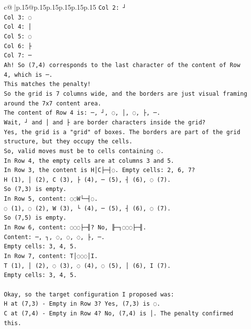 \documentclass{article}
\begin{document}
{\begin{supertabular}{c@{$\;$}|p{.15\linewidth}@{}p{.15\linewidth}p{.15\linewidth}p{.15\linewidth}p{.15\linewidth}p{.15\linewidth}}
{{{\texttt{Col 2: ┘} \\
\texttt{Col 3: ◌} \\
\texttt{Col 4: │} \\
\texttt{Col 5: ◌} \\
\texttt{Col 6: ├} \\
\texttt{Col 7: ─} \\
\texttt{Ah! So (7,4) corresponds to the last character of the content of Row 4, which is ─.} \\
\texttt{This matches the penalty!} \\
\texttt{So the grid is 7 columns wide, and the borders are just visual framing around the 7x7 content area.} \\
\texttt{The content of Row 4 is: ─, ┘, ◌, │, ◌, ├, ─.} \\
\texttt{Wait, ┘ and │ and ├ are border characters inside the grid?} \\
\texttt{Yes, the grid is a "grid" of boxes. The borders are part of the grid structure, but they occupy the cells.} \\
\texttt{So, valid moves must be to cells containing ◌.} \\
\texttt{In Row 4, the empty cells are at columns 3 and 5.} \\
\texttt{In Row 3, the content is H│C├─┤◌. Empty cells: 2, 6, 7?} \\
\texttt{H (1), │ (2), C (3), ├ (4), ─ (5), ┤ (6), ◌ (7).} \\
\texttt{So (7,3) is empty.} \\
\texttt{In Row 5, content: ◌◌W└─┤◌.} \\
\texttt{◌ (1), ◌ (2), W (3), └ (4), ─ (5), ┤ (6), ◌ (7).} \\
\texttt{So (7,5) is empty.} \\
\texttt{In Row 6, content: ◌◌◌├─╢? No, ╟─┐◌◌◌├─╢.} \\
\texttt{Content: ─, ┐, ◌, ◌, ◌, ├, ─.} \\
\texttt{Empty cells: 3, 4, 5.} \\
\texttt{In Row 7, content: T│◌◌◌│I.} \\
\texttt{T (1), │ (2), ◌ (3), ◌ (4), ◌ (5), │ (6), I (7).} \\
\texttt{Empty cells: 3, 4, 5.} \\
\\ 
\texttt{Okay, so the target configuration I proposed was:} \\
\texttt{H at (7,3) {-} Empty in Row 3? Yes, (7,3) is ◌.} \\
\texttt{C at (7,4) {-} Empty in Row 4? No, (7,4) is │. The penalty confirmed this.} \\
}}}
\end{supertabular}}
\end{document}

